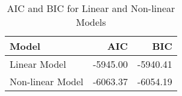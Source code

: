 \begin{table}[ht]
\centering
\begin{tabular}{lrr}
  \hline
Model & AIC & BIC \\ 
  \hline
Linear Model & -5945.00 & -5940.41 \\ 
  Non-linear Model & -6063.37 & -6054.19 \\ 
   \hline
\end{tabular}
\caption{AIC and BIC for Linear and Non-linear Models} 
\label{tab:aic_bic}
\end{table}
